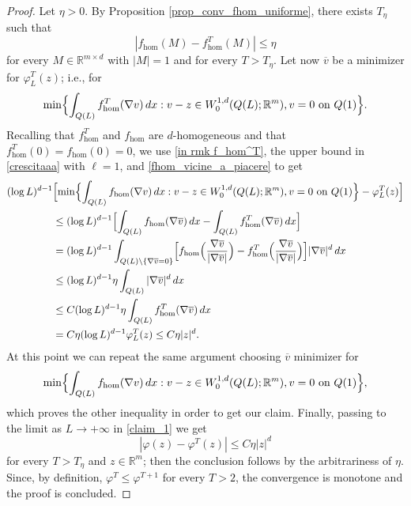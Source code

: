 \documentclass{article}
\theoremstyle{plain}
\theoremstyle{definition}
\def\rr{{\mathbb R}}
\newcommand{\f}{\varphi}
\numberwithin{equation}{section}
\begin{document}
\begin{proof}
Let $\eta>0$. By Proposition \ref{prop_conv_fhom_uniforme}, there exists $T_\eta$ such that
\begin{equation}
\label{fhom_vicine_a_piacere}
    |f_{\hom}(M)-f^T_{\hom}(M)|\leq \eta
\end{equation}
for every $M \in \mathbb{R}^{m\times d}$ with $|M|=1$ and for every $T>T_\eta$. Let now $
\overline{v}$ be a minimizer for $\f^T_L(z)$; i.e., for
\begin{equation*}
    \min\Bigl\{ \int_{Q(L)}f^T_{\rm hom}(\nabla v)\, dx : v-z\in W^{1,d}_0(Q(L);\mathbb{R}^m), v= 0 \text{ on } Q(1)\Bigr\}.
\end{equation*}
Recalling that $f^T_{\hom}$ and $f_{\hom}$ are $d$-homogeneous and that $f^T_{\hom}(0)=f_{\hom}(0)=0$, we use \eqref{in rmk f_hom^T}, the upper bound in \eqref{crescitaaa} with $\ell=1$, and  \eqref{fhom_vicine_a_piacere} to get
\begin{equation*}
\begin{split}
   (\log L)^{d-1}&\Bigl[\min\Bigl\{ \int_{Q(L)}f_{\rm hom}(\nabla v)\, dx : v-z\in W^{1,d}_0(Q(L);\mathbb{R}^m), v=0 \text{ on } Q(1)\Bigr\}- \f^T_L(z)\Bigr]\\
   &\leq (\log L)^{d-1}\Bigl[\int_{Q(L)}f_{\rm hom}(\nabla \overline{v})\, dx -\int_{Q(L)}f^T_{\rm hom}(\nabla \overline{v})\, dx\Bigr]\\
   &=(\log L)^{d-1}\int_{Q(L)\setminus\{\nabla \overline{v}=0\}}\Bigl[f_{\rm hom}\Bigl(\frac{\nabla \overline{v}}{|\nabla \overline{v}|}\Bigr)-f^T_{\rm hom}\Bigl(\frac{\nabla \overline{v}}{|\nabla \overline{v}|}\Bigr)\Bigr]|\nabla \overline{v}|^d\, dx\\
   &\leq (\log L)^{d-1}\eta\int_{Q(L)}|\nabla \overline{v}|^d\, dx\\
   &  \leq C(\log L)^{d-1}\eta\int_{Q(L)}f^T_{\rm hom}(\nabla \overline{v})\, dx\\
   &= C\eta(\log L)^{d-1} \f^T_L(z)\leq C\eta |z|^d.
\end{split}
\end{equation*}
At this point we can repeat the same argument choosing $\overline{v}$ minimizer for $$\min\Bigl\{ \int_{Q(L)}f_{\rm hom}(\nabla v)\, dx : v-z\in W^{1,d}_0(Q(L);\mathbb{R}^m), v=0\text{ on } Q(1)\Bigr\},$$ which proves the other inequality in order to get our claim. Finally, passing to the limit as $L\to +\infty$ in \eqref{claim_1} we get
\begin{equation*}
|\f(z)-\f^T(z)|\leq C \eta|z|^d
\end{equation*}
for every $T>T_\eta$ and $z\in\rr^m$; then the conclusion follows by the arbitrariness of $\eta$. Since, by definition, $\f^T\leq\f^{T+1}$ for every $T>2$, the convergence is monotone and the proof is concluded.
\end{proof}
\end{document}
